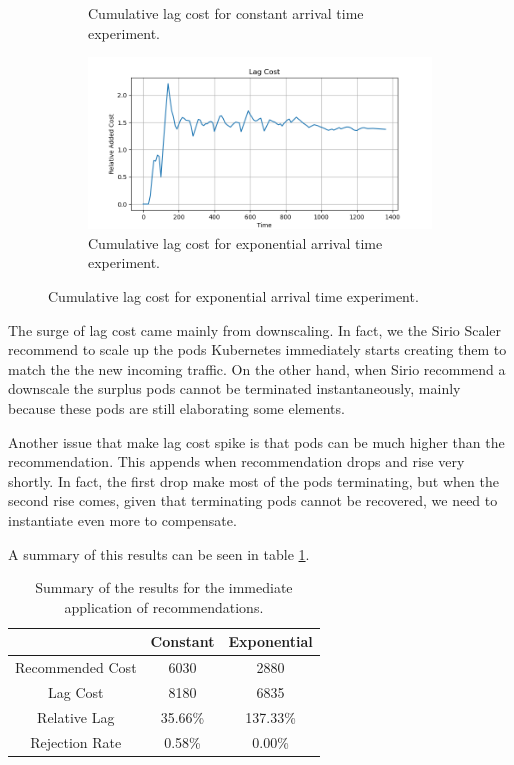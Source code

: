 \begin{figure}[H]
\begin{subfigure}{0.49\linewidth}
	    \caption{Cumulative lag cost for constant arrival time experiment.}
	    \label{fig:default_constant_lag}
	\end{subfigure}
	\begin{subfigure}{0.49\linewidth}
	    \centering
	    \includegraphics[width=1\linewidth]{images/default/exponential/lag_cost_cumulative.png}
	    \caption{Cumulative lag cost for exponential arrival time experiment.}
	    \label{fig:default_exponential_lag}
	\end{subfigure}
\end{figure}

The surge of lag cost came mainly from downscaling. In fact, we the Sirio Scaler recommend to scale up the pods Kubernetes immediately starts creating them to match the the new incoming traffic. On the other hand, when Sirio recommend a downscale the surplus pods cannot be terminated instantaneously, mainly because these pods are still elaborating some elements.

Another issue that make lag cost spike is that pods can be much higher than the recommendation. This appends when recommendation drops and rise very shortly. In fact, the first drop make most of the pods terminating, but when the second rise comes, given that terminating pods cannot be recovered, we need to instantiate even more to compensate.

A summary of this results can be seen in table \ref{tab:default_summary}.

\begin{table}[h]
	\centering
	\begin{tabular}{|c|c|c|}
		\hline
		& Constant & Exponential \\
		\hline
		Recommended Cost & 6030 & 2880 \\
		\hline
		Lag Cost & 8180 & 6835 \\
		\hline
		Relative Lag & 35.66\% & 137.33\%  \\
		\hline
		Rejection Rate & 0.58\% & 0.00\% \\
		\hline
	\end{tabular}
	\caption{Summary of the results for the immediate application of recommendations.}
	\label{tab:default_summary}
\end{table}

